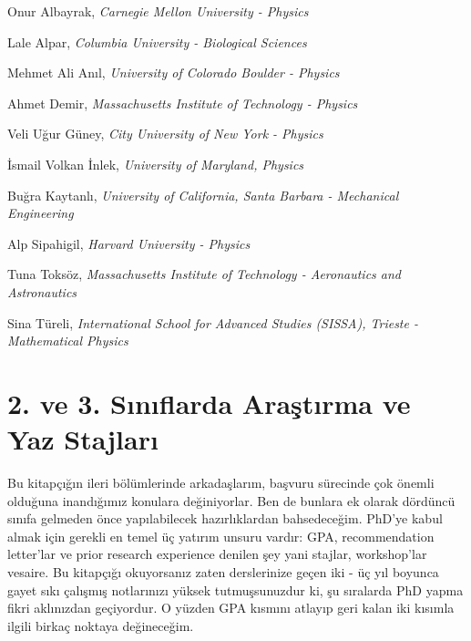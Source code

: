 \documentclass[12pt]{article}
\theoremstyle{break}
\begin{document}
Onur Albayrak, \textit{Carnegie Mellon University - Physics }

Lale Alpar, \textit{Columbia University - Biological Sciences}

Mehmet Ali Anıl, \textit{University of Colorado Boulder - Physics}

Ahmet Demir, \textit{Massachusetts Institute of Technology - Physics}

Veli Uğur Güney, \textit{City University of New York - Physics }

İsmail Volkan İnlek, \textit{University of Maryland, Physics}

Buğra Kaytanlı, \textit{University of California, Santa Barbara - Mechanical Engineering}

Alp Sipahigil, \textit{Harvard University - Physics }

Tuna Toksöz, \textit{Massachusetts Institute of Technology - Aeronautics and Astronautics }

Sina Türeli, \textit{International School for Advanced Studies (SISSA), Trieste - Mathematical Physics}

\newpage
%
%
\section{2. ve 3. Sınıflarda Araştırma ve Yaz Stajları}
Bu kitapçığın ileri bölümlerinde arkadaşlarım, başvuru sürecinde çok önemli olduğuna inandığımız konulara değiniyorlar. Ben de bunlara ek olarak dördüncü sınıfa gelmeden önce yapılabilecek hazırlıklardan bahsedeceğim. PhD’ye kabul almak için gerekli en temel üç yatırım unsuru vardır: GPA, recommendation letter’lar ve prior research experience denilen şey yani stajlar, workshop’lar vesaire. Bu kitapçığı okuyorsanız zaten derslerinize geçen iki - üç yıl boyunca gayet sıkı çalışmış notlarınızı yüksek tutmuşsunuzdur ki, şu sıralarda PhD yapma fikri aklınızdan geçiyordur. O yüzden GPA kısmını atlayıp geri kalan iki kısımla ilgili birkaç noktaya değineceğim.
\end{document}
